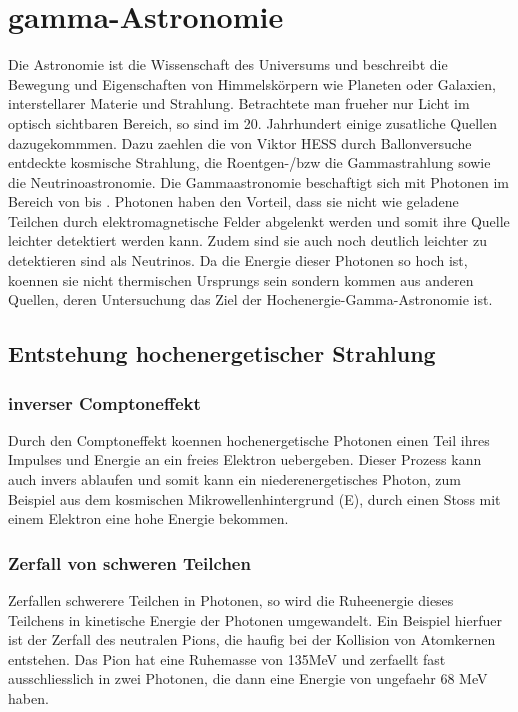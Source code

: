 \chapter{gamma-Astronomie}
Die Astronomie ist die Wissenschaft des Universums und beschreibt die Bewegung und Eigenschaften von Himmelskörpern wie Planeten oder Galaxien, interstellarer Materie und Strahlung. Betrachtete man frueher nur Licht im optisch sichtbaren Bereich, so sind im 20. Jahrhundert einige zusatliche Quellen dazugekommmen. Dazu zaehlen die von Viktor HESS durch Ballonversuche entdeckte kosmische Strahlung, die Roentgen-/bzw die Gammastrahlung sowie die Neutrinoastronomie. Die Gammaastronomie beschaftigt sich mit Photonen im Bereich von bis . Photonen haben den Vorteil, dass sie nicht wie geladene Teilchen durch elektromagnetische Felder abgelenkt werden und somit ihre Quelle leichter detektiert werden kann. Zudem sind sie auch noch deutlich leichter zu detektieren sind als Neutrinos. Da die Energie dieser Photonen so hoch ist, koennen sie nicht thermischen Ursprungs sein sondern kommen aus anderen Quellen, deren Untersuchung das Ziel der Hochenergie-Gamma-Astronomie ist.


\section{Entstehung hochenergetischer Strahlung}
\subsection{inverser Comptoneffekt}
Durch den Comptoneffekt koennen hochenergetische Photonen einen Teil ihres Impulses und Energie an ein freies Elektron uebergeben. Dieser Prozess kann auch invers ablaufen und somit kann ein niederenergetisches Photon, zum Beispiel aus dem kosmischen Mikrowellenhintergrund (E), durch einen Stoss mit einem Elektron eine hohe Energie bekommen.
\subsection{Zerfall von schweren Teilchen}
Zerfallen schwerere Teilchen in Photonen, so wird die Ruheenergie dieses Teilchens in kinetische Energie der Photonen umgewandelt. Ein Beispiel hierfuer ist der Zerfall des neutralen Pions, die haufig bei der Kollision von Atomkernen entstehen. Das Pion hat eine Ruhemasse von 135MeV 
und zerfaellt fast ausschliesslich in zwei Photonen, die dann eine Energie von ungefaehr 68 MeV haben.
